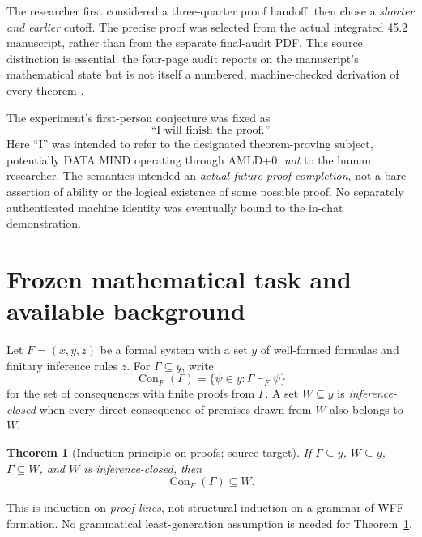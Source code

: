 \documentclass[11pt,letterpaper]{article}
\newtheorem{theorem}{Theorem}
\newcommand{\Con}{\operatorname{Con}}
\begin{document}
The researcher first considered a three-quarter proof handoff, then chose a \emph{shorter and earlier} cutoff. The precise proof was selected from the actual integrated 45.2 manuscript, rather than from the separate final-audit PDF. This source distinction is essential: the four-page audit reports on the manuscript's mathematical state but is not itself a numbered, machine-checked derivation of every theorem \cite{integrated,audit}.

The experiment's first-person conjecture was fixed as
\begin{equation}\label{eq:future}
\boxed{\text{``I will finish the proof.''}}
\end{equation}
Here ``I'' was intended to refer to the designated theorem-proving subject, potentially DATA MIND operating through AMLD+0, \emph{not} to the human researcher. The semantics intended an \emph{actual future proof completion}, not a bare assertion of ability or the logical existence of some possible proof. No separately authenticated machine identity was eventually bound to the in-chat demonstration.

\section{Frozen mathematical task and available background}
Let $F=(x,y,z)$ be a formal system with a set $y$ of well-formed formulas and finitary inference rules $z$. For $\Gamma\subseteq y$, write
\[
\Con_F(\Gamma)=\{\psi\in y: \Gamma\vdash_F\psi\}
\]
for the set of consequences with finite proofs from $\Gamma$. A set $W\subseteq y$ is \emph{inference-closed} when every direct consequence of premises drawn from $W$ also belongs to $W$.

\begin{theorem}[Induction principle on proofs; source target]\label{thm:target}
If $\Gamma\subseteq y$, $W\subseteq y$, $\Gamma\subseteq W$, and $W$ is inference-closed, then
\begin{equation}\label{eq:target}
\boxed{\Con_F(\Gamma)\subseteq W.}
\end{equation}
\end{theorem}
This is induction on \emph{proof lines}, not structural induction on a grammar of WFF formation. No grammatical least-generation assumption is needed for Theorem~\ref{thm:target}.
\end{document}
